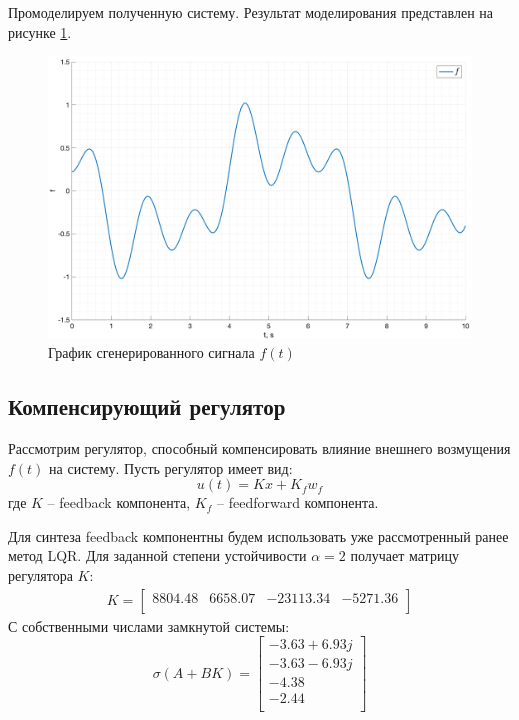 Промоделируем полученную систему. Результат моделирования представлен на рисунке \ref{fig:signal_generation}.
\begin{figure}[ht!]
    \centering
    \includegraphics[width=\textwidth]{media/plots/compensation/force.png}
    \caption{График сгенерированного сигнала $f(t)$}
    \label{fig:signal_generation}
\end{figure}

\subsection{Компенсирующий регулятор}
Рассмотрим регулятор, способный компенсировать влияние внешнего возмущения $f(t)$ на систему. Пусть регулятор имеет вид:
\begin{equation}
    u(t) = Kx + K_f w_f 
\end{equation}
где $K$ -- feedback компонента, $K_f$ -- feedforward компонента. 

Для синтеза feedback компонентны будем использовать уже рассмотренный ранее метод LQR.
Для заданной степени устойчивости $\alpha = 2$ получает матрицу регулятора $K$:
\begin{eqnarray}
    K = \begin{bmatrix}
        8804.48  & 6658.07  & -23113.34  & -5271.36 \\ 
    \end{bmatrix}
\end{eqnarray}
С собственными числами замкнутой системы:
\begin{equation}
    \sigma(A + BK) = \begin{bmatrix}
        -3.63 + 6.93j \\ 
        -3.63 - 6.93j \\ 
        -4.38 \\ 
        -2.44 \\ 
    \end{bmatrix}
\end{equation}

